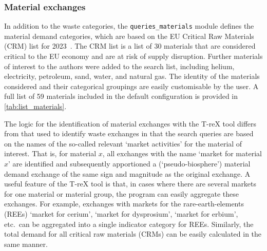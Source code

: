 \documentclass{article}
\renewcommand{\texttt}[1]{{\ttfamily\small\nolinkurl{#1}}}
\begin{document}
\subsubsection{Material exchanges}\label{sec:method-T-reX-material_exchanges}
In addition to the waste categories, the \texttt{queries\_materials} module defines the material demand categories, which are based on the EU Critical Raw Materials (CRM) list for 2023~\citep{eu2023crmstudy}. The CRM list is a list of 30 materials that are considered critical to the EU economy and are at risk of supply disruption. Further materials of interest to the authors were added to the search list, including helium, electricity, petroleum, sand, water, and natural gas. The identity of the materials considered and their categorical groupings are easily customisable by the user. A full list of 59 materials included in the default configuration is provided in \autoref{tab:list_materials}.

The logic for the identification of material exchanges with the T-reX tool differs from that used to identify waste exchanges in that the search queries are based on the names of the so-called relevant `market activities' for the material of interest. That is, for material $x$, all exchanges with the name `market for material $x$' are identified and subsequently apportioned a (`pseudo-biosphere') material demand exchange of the same sign and magnitude as the original exchange. A useful feature of the T-reX tool is that, in cases where there are several markets for one material or material group, the program can easily aggregate these exchanges. For example, exchanges with markets for the rare-earth-elements (REEs) `market for cerium', `market for dysprosium', `market for erbium', etc.\ can be aggregated into a single indicator category for REEs. Similarly, the total demand for all critical raw materials (CRMs) can be easily calculated in the same manner. 
\end{document}
